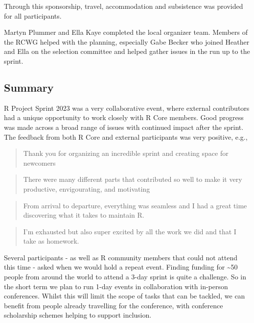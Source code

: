 Through this sponsorship, travel, accommodation and subsistence was provided for all participants.

Martyn Plummer and Ella Kaye completed the local organizer team. Members of the RCWG helped with the planning, especially Gabe Becker who joined Heather and Ella on the selection committee and helped gather issues in the run up to the sprint.

\hypertarget{summary}{%
\subsection{Summary}\label{summary}}

R Project Sprint 2023 was a very collaborative event, where external contributors had a unique opportunity to work closely with R Core members. Good progress was made across a broad range of issues with continued impact after the sprint. The feedback from both R Core and external participants was very positive, e.g.,

\begin{quote}
Thank you for organizing an incredible sprint and creating space for newcomers
\end{quote}

\begin{quote}
There were many different parts that contributed so well to
make it very productive, envigourating, and motivating
\end{quote}

\begin{quote}
From arrival to departure, everything was seamless and I had a great time discovering what it takes to maintain R.
\end{quote}

\begin{quote}
I'm exhausted but also super excited by all the work we did and that I take as homework.
\end{quote}

Several participants - as well as R community members that could not attend this time - asked when we would hold a repeat event. Finding funding for \textasciitilde50 people from around the world to attend a 3-day sprint is quite a challenge. So in the short term we plan to run 1-day events in collaboration with in-person conferences. Whilst this will limit the scope of tasks that can be tackled, we can benefit from people already travelling for the conference, with conference scholarship schemes helping to support inclusion.

